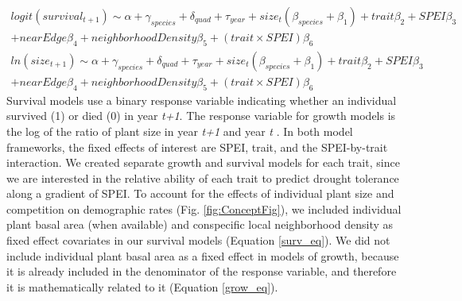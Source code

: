\documentclass[12pt, letterpaper]{article}
\begin{document}
\begin{multline}
\label{surv_eq}
logit(survival_{t+1})\sim \alpha + \gamma_{species}+ \delta_{quad} + \tau_{year} + size_t(\beta_{species}  + \beta_1) + trait\beta_2+ SPEI\beta_3\\ + nearEdge\beta_4  + neighborhoodDensity\beta_5 + (trait\times SPEI)\beta_6
\end{multline}
\begin{multline}
\label{grow_eq} 
ln(size_{t+1})\sim \alpha + \gamma_{species}+ \delta_{quad} + \tau_{year} + size_t(\beta_{species}  + \beta_1) +  trait\beta_2+ SPEI\beta_3\\ + nearEdge\beta_4  + neighborhoodDensity\beta_5 + (trait\times SPEI)\beta_6                                                       
\end{multline}
Survival models use a binary response variable indicating whether an individual survived (1) or died (0) in year \textit{t+1}. The response variable for growth models is the log of the ratio of plant size in year \textit{t+1} and year \textit{t} \citep{Dalgleish2011ClimatePlants, Dahlgren2009LinkingHerb}. In both model frameworks, the fixed effects of interest are SPEI, trait, and the SPEI-by-trait interaction. We created separate growth and survival models for each trait, since we are interested in the relative ability of each trait to predict drought tolerance along a gradient of SPEI. To account for the effects of individual plant size \citep{Tredennick2018} and competition on demographic rates (Fig. \ref{fig:ConceptFig}), we included individual plant basal area (when available) and conspecific local neighborhood density as fixed effect covariates in our survival models (Equation \ref{surv_eq}). We did not include individual plant basal area as a fixed effect in models of growth, because it is already included in the denominator of the response variable, and therefore it is mathematically related to it (Equation \ref{grow_eq}).
\end{document}
